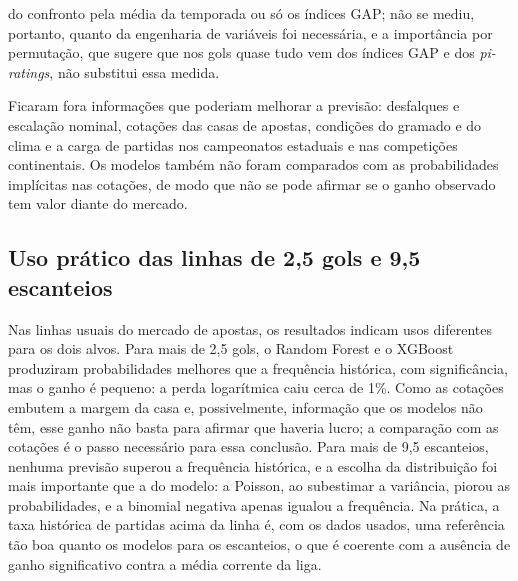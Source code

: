 do confronto pela média da temporada ou só os índices GAP; não se mediu, portanto, quanto da engenharia de variáveis foi necessária, e a importância por permutação, que sugere que nos gols quase tudo vem dos índices GAP e dos \textit{pi-ratings}, não substitui essa medida.

Ficaram fora informações que poderiam melhorar a previsão: desfalques e escalação nominal, cotações das casas de apostas, condições do gramado e do clima e a carga de partidas nos campeonatos estaduais e nas competições continentais. Os modelos também não foram comparados com as probabilidades implícitas nas cotações, de modo que não se pode afirmar se o ganho observado tem valor diante do mercado.

\subsection{Uso prático das linhas de 2,5 gols e 9,5 escanteios}\label{subsec:DiscLinhas}

Nas linhas usuais do mercado de apostas, os resultados indicam usos diferentes para os dois alvos. Para mais de 2,5 gols, o Random Forest e o XGBoost produziram probabilidades melhores que a frequência histórica, com significância, mas o ganho é pequeno: a perda logarítmica caiu cerca de 1\%. Como as cotações embutem a margem da casa e, possivelmente, informação que os modelos não têm, esse ganho não basta para afirmar que haveria lucro; a comparação com as cotações é o passo necessário para essa conclusão. Para mais de 9,5 escanteios, nenhuma previsão superou a frequência histórica, e a escolha da distribuição foi mais importante que a do modelo: a Poisson, ao subestimar a variância, piorou as probabilidades, e a binomial negativa apenas igualou a frequência. Na prática, a taxa histórica de partidas acima da linha é, com os dados usados, uma referência tão boa quanto os modelos para os escanteios, o que é coerente com a ausência de ganho significativo contra a média corrente da liga.
